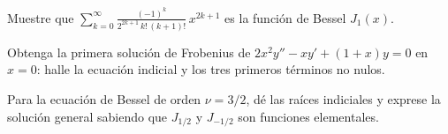 \begin{prob}
Muestre que $\displaystyle\sum_{k=0}^{\infty} \frac{(-1)^k}{2^{2k+1}\,k!\,(k+1)!}\,x^{2k+1}$ es la función de Bessel $J_1(x)$.
\end{prob}

\begin{prob}
Obtenga la primera solución de Frobenius de $2x^2 y'' - x y' + (1+x)y = 0$ en $x=0$: halle la ecuación indicial y los tres primeros términos no nulos.
\end{prob}

\begin{prob}
Para la ecuación de Bessel de orden $\nu=3/2$, dé las raíces indiciales y exprese la solución general sabiendo que $J_{1/2}$ y $J_{-1/2}$ son funciones elementales.
\end{prob}
